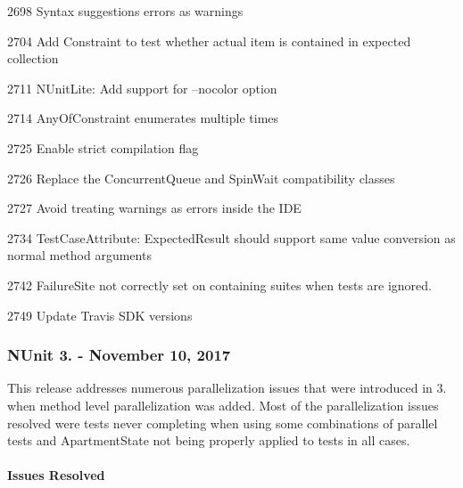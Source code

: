 \begin{DoxyItemize}
\item 2698 Syntax suggestions errors as warnings
\item 2704 Add Constraint to test whether actual item is contained in expected collection
\item 2711 N\+Unit\+Lite\+: Add support for --nocolor option
\item 2714 Any\+Of\+Constraint enumerates multiple times
\item 2725 Enable \textquotesingle{}strict\textquotesingle{} compilation flag
\item 2726 Replace the Concurrent\+Queue and Spin\+Wait compatibility classes
\item 2727 Avoid treating warnings as errors inside the I\+DE
\item 2734 Test\+Case\+Attribute\+: Expected\+Result should support same value conversion as normal method arguments
\item 2742 Failure\+Site not correctly set on containing suites when tests are ignored.
\item 2749 Update Travis S\+DK versions
\end{DoxyItemize}

\subsubsection*{N\+Unit 3. -\/ November 10, 2017}

This release addresses numerous parallelization issues that were introduced in 3. when method level parallelization was added. Most of the parallelization issues resolved were tests never completing when using some combinations of parallel tests and {\ttfamily Apartment\+State} not being properly applied to tests in all cases.

\paragraph*{Issues Resolved}


